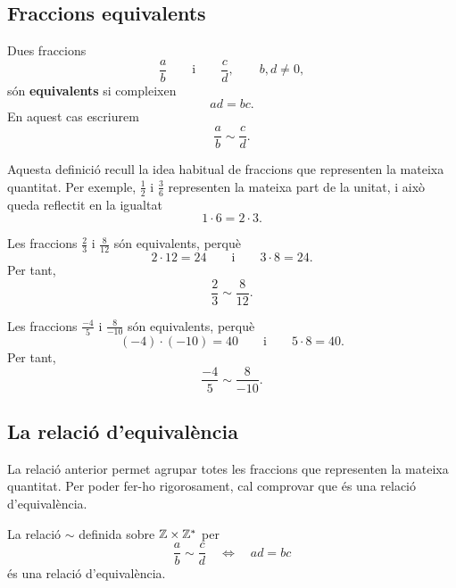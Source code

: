 \subsection{Fraccions equivalents}

Dues fraccions
\[
\frac{a}{b}
\qquad\text{i}\qquad
\frac{c}{d},
\qquad b,d\neq0,
\]
són \textbf{equivalents} si compleixen
\[
ad=bc.
\]
En aquest cas escriurem
\[
\frac{a}{b}\sim\frac{c}{d}.
\]

Aquesta definició recull la idea habitual de fraccions que representen la mateixa quantitat. Per exemple, \(\frac{1}{2}\) i \(\frac{3}{6}\) representen la mateixa part de la unitat, i això queda reflectit en la igualtat
\[
1\cdot 6=2\cdot 3.
\]

\begin{exemple}
	Les fraccions \(\frac{2}{3}\) i \(\frac{8}{12}\) són equivalents, perquè
	\[
	2\cdot12=24
	\qquad\text{i}\qquad
	3\cdot8=24.
	\]
	Per tant,
	\[
	\frac{2}{3}\sim\frac{8}{12}.
	\]
\end{exemple}

\begin{exemple}
	Les fraccions \(\frac{-4}{5}\) i \(\frac{8}{-10}\) són equivalents, perquè
	\[
	(-4)\cdot(-10)=40
	\qquad\text{i}\qquad
	5\cdot8=40.
	\]
	Per tant,
	\[
	\frac{-4}{5}\sim\frac{8}{-10}.
	\]
\end{exemple}

\subsection{La relació d'equivalència}

La relació anterior permet agrupar totes les fraccions que representen la mateixa quantitat. Per poder fer-ho rigorosament, cal comprovar que és una relació d'equivalència.

\begin{proposicio}
	La relació \(\sim\) definida sobre \(\mathbb{Z}\times\mathbb{Z}^{*}\) per
	\[
	\frac{a}{b}\sim\frac{c}{d}
	\quad\Longleftrightarrow\quad
	ad=bc
	\]
	és una relació d'equivalència.
\end{proposicio}

